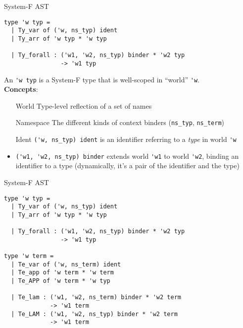 \documentclass{beamer}          %
\begin{document}
\begin{frame}[fragile]{System-F AST}

\begin{lstlisting}
type 'w typ =
  | Ty_var of ('w, ns_typ) ident
  | Ty_arr of 'w typ * 'w typ

  | Ty_forall : ('w1, 'w2, ns_typ) binder * 'w2 typ
                -> 'w1 typ
\end{lstlisting}

An \lstinline{'w typ} is a System-F type that is well-scoped in ``world'' \lstinline{'w}.
~\\
\pause
\textbf{Concepts}:
\begin{itemize}
  \setlength{\itemindent}{1em}
  \item[World] Type-level reflection of a set of names
  \item[Namespace] The different kinds of context binders {\small (\texttt{ns\_typ}, \texttt{ns\_term})}
  \item[Ident] \lstinline{('w, ns_typ) ident} is an identifier referring to a {\em type}
        in world \lstinline{'w}
  \item[Binder] \lstinline{('w1, 'w2, ns_typ) binder} extends world \lstinline{'w1}
        to world \lstinline{'w2}, binding an identifier to a type (dynamically, it's a pair of the identifier and the type)
\end{itemize}

\end{frame}

\begin{frame}[fragile]{System-F AST}

\begin{lstlisting}
type 'w typ =
  | Ty_var of ('w, ns_typ) ident
  | Ty_arr of 'w typ * 'w typ

  | Ty_forall : ('w1, 'w2, ns_typ) binder * 'w2 typ
                -> 'w1 typ

type 'w term =
  | Te_var of ('w, ns_term) ident
  | Te_app of 'w term * 'w term
  | Te_APP of 'w term * 'w typ

  | Te_lam : ('w1, 'w2, ns_term) binder * 'w2 term
             -> 'w1 term
  | Te_LAM : ('w1, 'w2, ns_typ) binder * 'w2 term
             -> 'w1 term
\end{lstlisting}

\end{frame}
\end{document}
